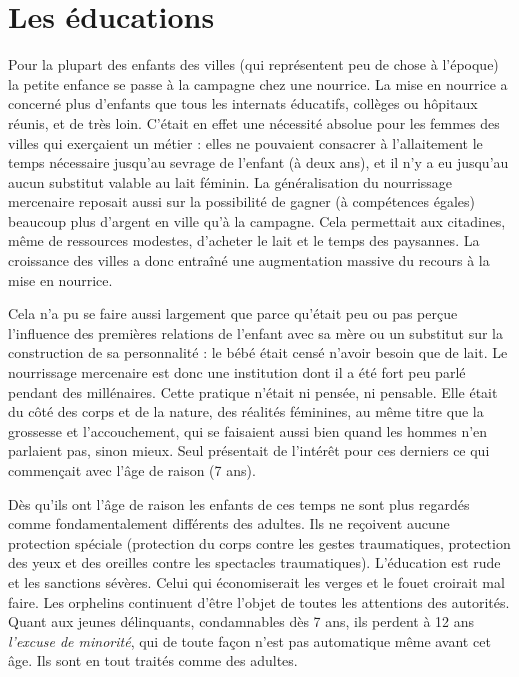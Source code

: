 \section{Les éducations}

 Pour la plupart des enfants des villes (qui représentent peu de chose à l'époque) la petite enfance se passe à la campagne chez une nourrice. La mise en nourrice a concerné plus d'enfants que tous les internats éducatifs, collèges ou hôpitaux réunis, et de très loin. C'était en effet une nécessité absolue pour les femmes des villes qui exerçaient un métier : elles ne pouvaient consacrer à l'allaitement le temps nécessaire jusqu'au sevrage de l'enfant (à deux ans), et il n'y a eu jusqu'au  aucun substitut valable au lait féminin. La généralisation du nourrissage mercenaire reposait aussi sur la possibilité de gagner (à compétences égales) beaucoup plus d'argent en ville qu'à la campagne. Cela permettait aux citadines, même de ressources modestes, d'acheter le lait et le temps des paysannes. La croissance des villes a donc entraîné une augmentation massive du recours à la mise en nourrice.

 Cela n'a pu se faire aussi largement que parce qu'était peu ou pas perçue l'influence des premières relations de l'enfant avec sa mère ou un substitut sur la construction de sa personnalité : le bébé était censé n'avoir besoin que de lait. Le nourrissage mercenaire est donc une institution dont il a été fort peu parlé pendant des millénaires. Cette pratique n'était ni pensée, ni pensable. Elle était du côté des corps et de la nature, des réalités féminines, au même titre que la grossesse et l'accouchement, qui se faisaient aussi bien quand les hommes n'en parlaient pas, sinon mieux. Seul présentait de l'intérêt pour ces derniers ce qui commençait avec l'âge de raison (7 ans).

 Dès qu'ils ont l'âge de raison les enfants de ces temps ne sont plus regardés comme fondamentalement différents des adultes. Ils ne reçoivent aucune protection spéciale (protection du corps contre les gestes traumatiques, protection des yeux et des oreilles contre les spectacles traumatiques). L'éducation est rude et les sanctions sévères. Celui qui économiserait les verges et le fouet croirait mal faire. Les orphelins continuent d'être l'objet de toutes les attentions des autorités. Quant aux jeunes délinquants, condamnables dès 7 ans, ils perdent à 12 ans \emph{l'excuse de minorité}, qui de toute façon n'est pas automatique même avant cet âge. Ils sont en tout traités comme des adultes.

